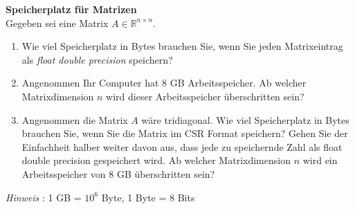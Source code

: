 \textbf{Speicherplatz für Matrizen}\\
Gegeben sei eine Matrix $A \in \mathbb{R}^{n \times n}$. 
\begin{enumerate}
	\item Wie viel Speicherplatz in Bytes brauchen Sie, wenn Sie jeden Matrixeintrag als \textit{float double precision} speichern?
	\item Angenommen Ihr Computer hat 8 GB Arbeitsspeicher. Ab welcher Matrixdimension $n$ wird dieser Arbeitsspeicher überschritten sein?
	\item Angenommen die Matrix $A$ wäre tridiagonal. Wie viel Speicherplatz in Bytes brauchen Sie, wenn Sie die Matrix im CSR Format speichern? Gehen Sie der Einfachheit halber weiter davon aus, dass jede zu speichernde Zahl als float double precision gespeichert wird. Ab welcher Matrixdimension $n$ wird ein Arbeitsspeicher von 8 GB überschritten sein?
\end{enumerate}

\textit{Hinweis }: 1 GB = $10^6$ Byte, 1 Byte = 8 Bits